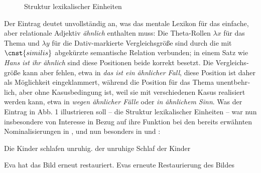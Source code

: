 \documentclass[output=paper,colorlinks,citecolor=brown]{langscibook}
\begin{document}
\begin{otherlanguage}{german}
\begin{figure}[h]
    \caption{Struktur lexikalischer Einheiten}
    \label{fig:entry}
\end{figure}

\noindent Der Eintrag deutet unvollständig an, was das mentale Lexikon für das einfache, aber relationale Adjektiv \textit{ähnlich} enthalten muss: Die Theta-Rollen $\lambda x$ %
für das Thema und $\lambda y$ %
für die Dativ-markierte Vergleichsgröße sind durch die mit $\cnst{similis}$ abgekürzte semantische Relation verbunden; in einem Satz wie \textit{Hans ist ihr ähnlich} sind diese Positionen beide korrekt besetzt. Die Vergleichsgröße kann aber fehlen, etwa in \textit{das ist ein ähnlicher Fall}, diese Position ist daher als Möglichkeit eingeklammert, während die Position für das Thema unentbehrlich, aber ohne Kasusbedingung ist, weil sie mit verschiedenen Kasus realisiert werden kann, etwa in \textit{wegen ähnlicher Fälle} oder \textit{in ähnlichem Sinn}. Was der Eintrag in Abb. 1 illustrieren soll -- die Struktur lexikalischer Einheiten -- war nun insbesondere von Interesse in Bezug auf ihre Funktion bei den bereits erwähnten Nominalisierungen in ,  und nun besonders in  und :

\ea 
\ea Die Kinder schlafen unruhig. 
\ex der unruhige Schlaf der Kinder
\z
\label{ex:11}
\z

\ea 
\ea Eva hat das Bild erneut restauriert.
\ex Evas erneute Restaurierung des Bildes
\z
\label{ex:12}
\z


\end{otherlanguage}
\end{document}
